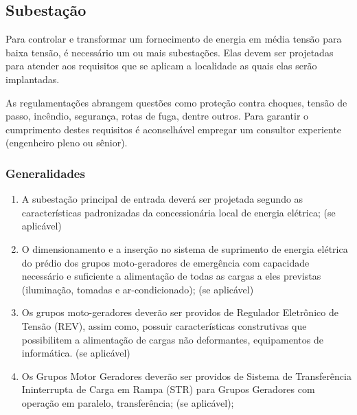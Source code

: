 \subsection{Subestação} \label{section: power plant}

Para controlar e transformar um fornecimento de energia em média tensão para baixa tensão, é necessário um ou mais subestações. Elas devem ser projetadas para atender aos requisitos que se aplicam a localidade as quais elas serão implantadas.

As regulamentações abrangem questões como proteção contra choques, tensão de passo, incêndio, segurança, rotas de fuga, dentre outros. Para garantir o cumprimento destes requisitos é aconselhável empregar um consultor experiente (engenheiro pleno ou sênior).

\subsubsection{Generalidades}

\begin{enumerate}
	\item A subestação principal de entrada deverá ser projetada segundo as características padronizadas da concessionária local de energia elétrica; (se aplicável)
	
	\item O dimensionamento e a inserção no sistema de suprimento de energia elétrica do prédio dos grupos moto-geradores de emergência com capacidade necessário e suficiente a alimentação de todas as cargas a eles previstas (iluminação, tomadas e ar-condicionado); (se aplicável)
	
	\item Os grupos moto-geradores deverão ser providos de Regulador Eletrônico de Tensão (REV), assim como, possuir características construtivas que possibilitem a alimentação de cargas não deformantes, equipamentos de informática. (se aplicável)
	
	\item Os Grupos Motor Geradores deverão ser providos de Sistema de Transferência Ininterrupta de Carga em Rampa (STR) para Grupos Geradores com operação em paralelo, transferência; (se aplicável);	
	
\end{enumerate}

